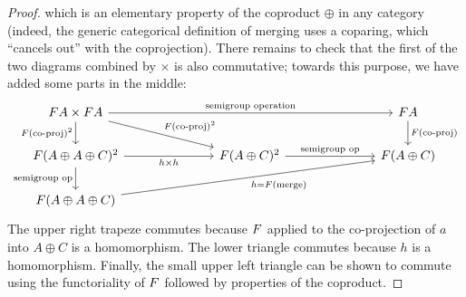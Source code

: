 \begin{proof}
    which is an elementary property of the coproduct $\oplus$ in any category (indeed, the generic categorical definition of merging uses a coparing, which \enquote{cancels out} with the coprojection).
    There remains to check that the first of the two diagrams combined by $\times$ is also commutative; towards this purpose, we have added some parts in the middle:
    \[\begin{tikzcd}
        [column sep=2.5cm]
        \functor A\times \functor A
        \ar[d,"\functor(\text{co-proj})^2"']
        \ar[dr,"\functor(\text{co-proj})^2"]
        \ar[rr,"\text{semigroup operation}"]
        &
        &
        \functor A
        \ar[d,"\functor(\text{co-proj})"]
        \\
        \functor(A \oplus A \oplus C)^2
        \ar[d,"\text{semigroup op}"']
        \ar[r,"h\times h"']
        &
        \functor(A \oplus C)^2
        \ar[r,"\text{semigroup op}"]
        &
        \functor(A \oplus C)
        \\
        \functor(A \oplus A \oplus C)
            \ar[rru,"h = F(\text{merge})"']
    \end{tikzcd}\]
    The upper right trapeze commutes because $\functor$ applied to the co-projection of $a$ into $A\oplus C$ is a homomorphism. The lower triangle commutes because $h$ is a homomorphism. Finally, the small upper left triangle can be shown to commute using the functoriality of $\functor$ followed by properties of the coproduct.
\end{proof}
